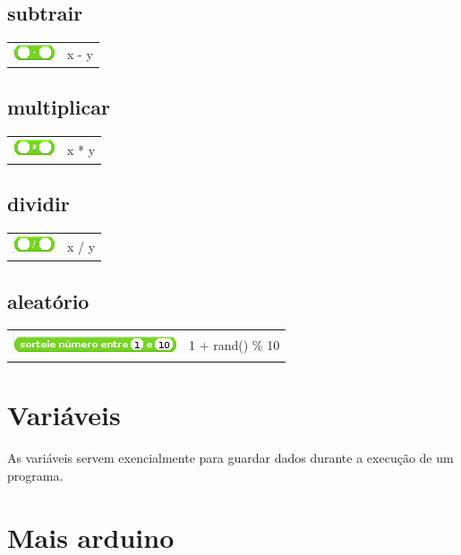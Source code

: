 \documentclass{article}
\begin{document}
\subsection{subtrair}
\begin{tabular}{ c c }
    \includegraphics{imgs/operators/minus} & x - y \\
\end{tabular}
\subsection{multiplicar}
\begin{tabular}{ c c }
    \includegraphics{imgs/operators/multiply} & x * y \\
\end{tabular}
\subsection{dividir}
\begin{tabular}{ c c }
    \includegraphics{imgs/operators/divide} & x / y \\
\end{tabular}
\subsection{aleatório}
\begin{tabular}{ c c }
    \includegraphics{imgs/operators/random-between} & 1 + rand() \% 10 \\
\end{tabular}

\section{Variáveis}
As variáveis servem exencialmente para guardar dados durante a execução de um programa.

\section{Mais arduino}
\end{document}
